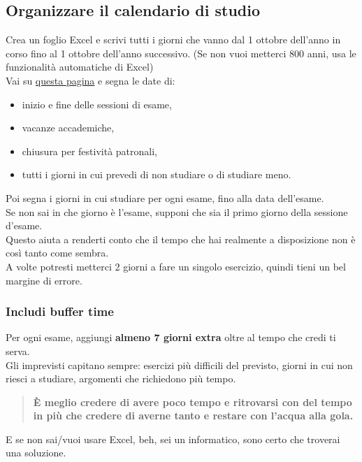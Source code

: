 \documentclass{article}
\begin{document}
\subsection{Organizzare il calendario di studio}
Crea un foglio Excel e scrivi tutti i giorni che vanno dal 1 ottobre dell'anno in corso fino al 1 ottobre dell'anno successivo. (Se non vuoi metterci 800 anni, usa le funzionalità automatiche di Excel)\\
Vai su \href{https://www.uniud.it/it/didattica/corsi/area-scientifica/scienze-matematiche-informatiche-multimediali-fisiche/laurea/informatica/studiare/orario-lezioni}{questa pagina} e segna le date di:
\begin{itemize}
\item inizio e fine delle sessioni di esame,
\item vacanze accademiche,
\item chiusura per festività patronali,
\item tutti i giorni in cui prevedi di non studiare o di studiare meno.
\end{itemize}
Poi segna i giorni in cui studiare per ogni esame, fino alla data dell'esame.\\
Se non sai in che giorno è l'esame, supponi che sia il primo giorno della sessione d'esame.\\
Questo aiuta a renderti conto che il tempo che hai realmente a disposizione non è così tanto come sembra.\\
A volte potresti metterci 2 giorni a fare un singolo esercizio, quindi tieni un bel margine di errore.


\subsubsection{Includi buffer time}
Per ogni esame, aggiungi \textbf{almeno 7 giorni extra} oltre al tempo che credi ti serva.\\
Gli imprevisti capitano sempre: esercizi più difficili del previsto, giorni in cui non riesci a studiare, argomenti che richiedono più tempo.
\begin{quote}
\textbf{È meglio credere di avere poco tempo e ritrovarsi con del tempo in più che credere di averne tanto e restare con l'acqua alla gola.}
\end{quote}%
E se non sai/vuoi usare Excel, beh, sei un informatico, sono certo che troverai una soluzione.
\end{document}
